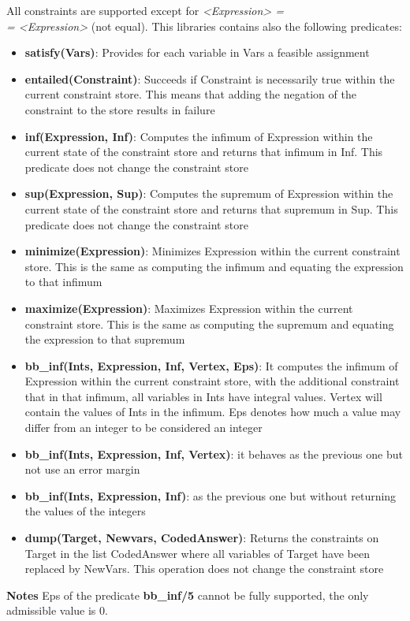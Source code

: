 All constraints are supported except for \textit{<Expression> =\\= <Expression>} (not equal).
This libraries contains also the following predicates:
\begin{itemize}
    \item \textbf{satisfy(Vars)}: Provides for each variable in Vars a feasible assignment
    \item \textbf{entailed(Constraint)}: Succeeds if Constraint is necessarily true within the current constraint store. This means that adding the negation of the constraint to the store results in failure
    \item \textbf{inf(Expression, Inf)}: Computes the infimum of Expression within the current state of the constraint store and returns that infimum in Inf. This predicate does not change the constraint store
    \item \textbf{sup(Expression, Sup)}: Computes the supremum of Expression within the current state of the constraint store and returns that supremum in Sup. This predicate does not change the constraint store
    \item \textbf{minimize(Expression)}: Minimizes Expression within the current constraint store. This is the same as computing the infimum and equating the expression to that infimum
    \item \textbf{maximize(Expression)}: Maximizes Expression within the current constraint store. This is the same as computing the supremum and equating the expression to that supremum
    \item \textbf{bb\_inf(Ints, Expression, Inf, Vertex, Eps)}: It computes the infimum of Expression within the current constraint store, with the additional constraint that in that infimum, all variables in Ints have integral values. Vertex will contain the values of Ints in the infimum. Eps denotes how much a value may differ from an integer to be considered an integer
    \item \textbf{bb\_inf(Ints, Expression, Inf, Vertex)}: it behaves as the previous one but not use an error margin
    \item \textbf{bb\_inf(Ints, Expression, Inf)}: as the previous one but without returning the values of the integers
    \item \textbf{dump(Target, Newvars, CodedAnswer)}: Returns the constraints on Target in the list CodedAnswer where all variables of Target have been replaced by NewVars. This operation does not change the constraint store
\end{itemize}
\textbf{Notes}\newline\newline
Eps of the predicate \textbf{bb\_inf/5} cannot be fully supported, the only admissible value is 0.

